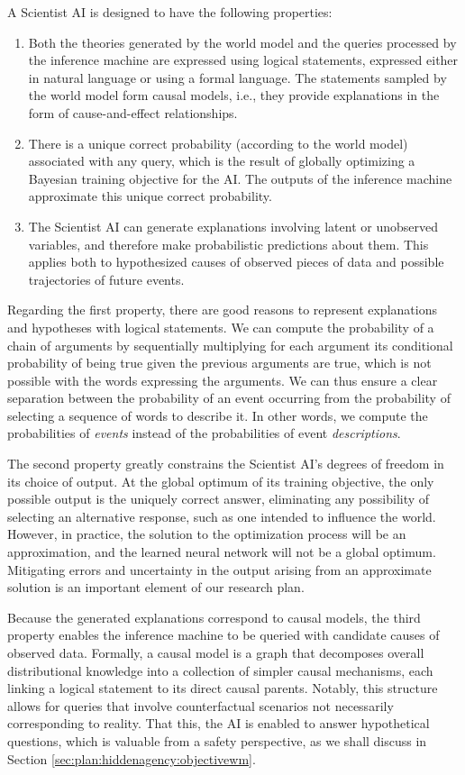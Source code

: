 A Scientist AI is designed to have the following properties:

\begin{enumerate}
    \item Both the theories generated by the world model and the queries processed by the inference machine are expressed using logical statements, expressed either in natural language or using a formal language. The statements sampled by the world model form causal models, i.e., they provide explanations in the form of cause-and-effect relationships.
    \item There is a unique correct probability (according to the world model) associated with any query, which is the result of globally optimizing a Bayesian training objective for the AI. The outputs of the inference machine approximate this unique correct probability.   
    \item The Scientist AI can generate explanations involving latent or unobserved variables, and therefore make probabilistic predictions about them. This applies both to hypothesized causes of observed pieces of data and possible trajectories of future events.
\end{enumerate}

Regarding the first property, there are good reasons to represent explanations and hypotheses with logical statements. We can compute the probability of a chain of arguments by sequentially multiplying for each argument its conditional probability of being true given the previous arguments are true, which is not possible with the words expressing the arguments. We can thus ensure a clear separation between the probability of an event occurring from the probability of selecting a sequence of words to describe it. In other words, we compute the probabilities of \emph{events} instead of the probabilities of event \emph{descriptions}. 

The second property greatly constrains the Scientist AI's degrees of freedom in its choice of output. At the global optimum of its training objective, the only possible output is the uniquely correct answer, eliminating any possibility of selecting an alternative response, such as one intended to influence the world. However, in practice, the solution to the optimization process will be an approximation, and the learned neural network will not be a global optimum. Mitigating errors and uncertainty in the output arising from an approximate solution is an important element of our research plan.

Because the generated explanations correspond to causal models, the third property enables the inference machine to be queried with candidate causes of observed data. Formally, a causal model is a graph that decomposes overall distributional knowledge into a collection of simpler causal mechanisms, each linking a logical statement to its direct causal parents. Notably, this structure allows for queries that involve counterfactual scenarios not necessarily corresponding to reality. That this, the AI is enabled to answer hypothetical questions, which is valuable from a safety perspective, as we shall discuss in Section \ref{sec:plan:hiddenagency:objectivewm}.


